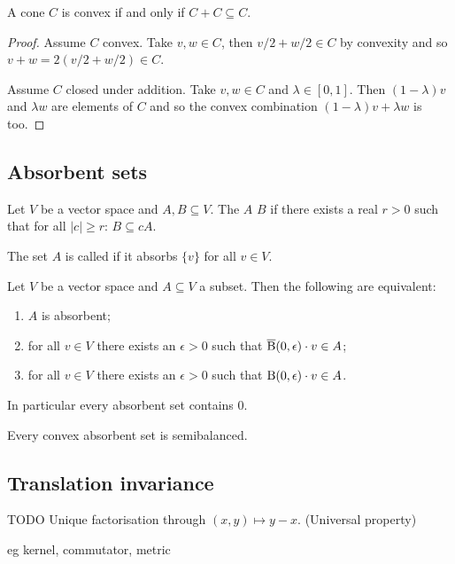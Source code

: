 \begin{lemma} \label{convexityAdditiveClosure}
A cone $C$ is convex if and only if $C + C \subseteq C$. 
\end{lemma}
\begin{proof}
Assume $C$ convex. Take $v,w\in C$, then $v/2 + w/2\in C$ by convexity and so $v+w = 2(v/2+w/2)\in C$.

Assume $C$ closed under addition. Take $v,w\in C$ and $\lambda\in[0,1]$. Then $(1-\lambda)v$ and $\lambda w$ are elements of $C$ and so the convex combination $(1-\lambda)v + \lambda w$ is too.
\end{proof}


\subsection{Absorbent sets}
\begin{definition}
Let $V$ be a vector space and $A,B\subseteq V$. The $A$  $B$ if there exists a real $r>0$ such that for all $|c| \geq r$: $B\subseteq cA$.

The set $A$ is called  if it absorbs $\{v\}$ for all $v\in V$.
\end{definition}

\begin{lemma}
Let $V$ be a vector space and $A\subseteq V$ a subset. Then the following are equivalent:
\begin{enumerate}
\item $A$ is absorbent;
\item for all $v\in V$ there exists an $\epsilon>0$ such that $\operatorname{\overline{B}}(0,\epsilon)\cdot v\in A$;
\item for all $v\in V$ there exists an $\epsilon>0$ such that $\operatorname{B}(0,\epsilon)\cdot v\in A$.
\end{enumerate}
In particular every absorbent set contains $0$.
\end{lemma}
\begin{corollary} \label{convexAbsorbentImpliesSemibalanced}
Every convex absorbent set is semibalanced.
\end{corollary}

\subsection{Translation invariance}
TODO Unique factorisation through $(x,y)\mapsto y-x$. (Universal property)

eg kernel, commutator, metric

